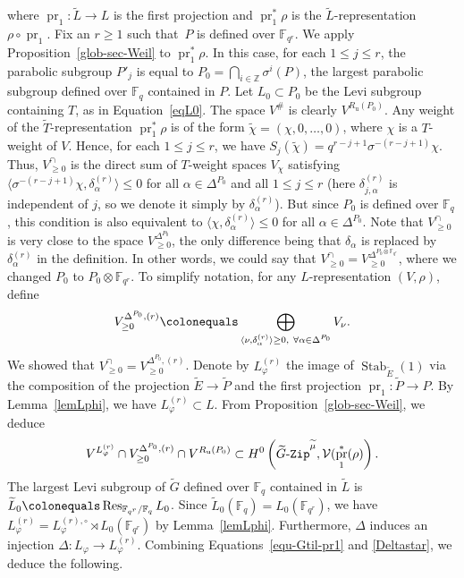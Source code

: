 \documentclass[11pt]{amsart}
\numberwithin{equation}{section}
\theoremstyle{definition}
\theoremstyle{remark}
\newcommand{\GtilZip}{\mathop{\text{$\widetilde{G}$-{\tt Zip}}}\nolimits}
\newcommand{\Vcal}{{\mathcal V}}
\newcommand{\FF}{\mathbb{F}}
\newcommand{\ZZ}{\mathbb{Z}}
\DeclareMathOperator{\Stab}{Stab}
\DeclareMathOperator{\pr}{pr}
\DeclareMathOperator{\Res}{Res}
\begin{document}
where $\pr_1\colon \widetilde{L}\to L$ is the first projection and $\pr_1^*\rho$ is the $\widetilde{L}$-representation $\rho \circ \pr_1$. Fix an $r\geq 1$ such that~$P$ is defined over $\FF_{q^r}$. We apply Proposition~\ref{glob-sec-Weil} to $\pr_1^*\rho$. In this case, for each $1\leq j \leq r$, the parabolic subgroup $P'_j$ is equal to $P_0=\bigcap_{i\in \ZZ} \sigma^i(P)$, the largest parabolic subgroup defined over $\FF_q$ contained in $P$. Let $L_0\subset P_0$ be the Levi subgroup containing $T$, as in Equation~\eqref{eqL0}. The space $V^{\#}$ is clearly $V^{R_{\textrm{u}}(P_0)}$. Any weight of the $\widetilde{T}$-representation $\pr_1^*\rho$ is of the form $\widetilde{\chi} = (\chi,0, \dots , 0)$, where $\chi$ is a $T$-weight of $V$. Hence, for each $1\leq j \leq r$, we have $S_j(\widetilde{\chi})=q^{r-j+1}\sigma^{-(r-j+1)}\chi$. Thus, $V_{\geq 0}^{\cap}$ is the direct sum of $T$-weight spaces $V_\chi$ satisfying $\langle \sigma^{-(r-j+1)}\chi, \delta^{(r)}_{\alpha} \rangle \leq 0$ for all $\alpha \in \Delta^{P_0}$ and all $1\leq j \leq r$ (here $\delta^{(r)}_{j,\alpha}$ is independent of $j$, so we denote it simply by $\delta^{(r)}_{\alpha}$). But since $P_0$ is defined over $\FF_q$, this condition is also equivalent to $\langle \chi, \delta^{(r)}_\alpha \rangle \leq 0$ for all $\alpha \in \Delta^{P_0}$. Note that $V^{\cap}_{\geq 0}$ is very close to the space $V^{\Delta^{P_0}}_{\geq 0}$, the only difference being that $\delta_\alpha$ is replaced by $\delta^{(r)}_\alpha$ in the definition. In other words, we could say that $V^{\cap}_{\geq 0}= V^{\Delta^{P_0\otimes \FF_{q^r}}}_{\geq 0}$, where we changed $P_0$ to $P_{0}\otimes \FF_{q^r}$. To simplify notation, for any $L$-representation $(V,\rho)$,  define
\begin{equation}\label{equ-VDeltarP0}
V^{\Delta^{P_0},(r)}_{\geq 0}\colonequals  \bigoplus_{\substack{\langle \nu,\delta^{(r)}_{\alpha} \rangle \geq 0, \ 
 \forall \alpha\in \Delta^{P_0}}} V_\nu.
\end{equation}
We showed that $V^{\cap}_{\geq 0}=V^{\Delta^{P_0},(r)}_{\geq 0}$. Denote by $L_{\varphi}^{(r)}$ the image of $\Stab_{\widetilde{E}}(1)$ via the composition of the projection $\widetilde{E}\to \widetilde{P}$ and the first projection $\pr_1\colon \widetilde{P}\to P$. By Lemma~\ref{lemLphi}, we have $L_{\varphi}^{(r)}\subset L$. 
From Proposition~\ref{glob-sec-Weil}, we deduce 
\begin{equation}\label{equ-Gtil-pr1}
    V^{L_{\varphi}^{(r)}} \cap V^{\Delta^{P_0},(r)}_{\geq 0} \cap V^{R_{\textrm{u}}(P_0)} \subset H^0\left(\GtilZip^{\widetilde{\mu}},\Vcal(\pr_1^*(\rho)\right).
\end{equation}
The largest Levi subgroup of $\widetilde{G}$ defined over $\FF_q$ contained in $\widetilde{L}$ is $\widetilde{L}_0 \colonequals \Res_{\FF_{q^r}/\FF_q} L_0$. Since $\widetilde{L}_0(\FF_q) = L_0(\FF_{q^r})$, we have $L_{\varphi}^{(r)} = L_{\varphi}^{(r),\circ}\rtimes L_0(\FF_{q^r})$ by Lemma~\ref{lemLphi}. 
Furthermore, $\Delta$ induces an injection $\Delta\colon L_\varphi \to L_{\varphi}^{(r)}$. Combining Equations~\eqref{equ-Gtil-pr1} and \eqref{Deltastar}, we deduce the following. 
\end{document}
